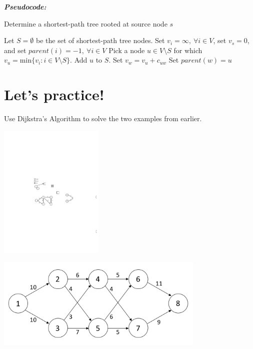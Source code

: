 \documentclass[12pt]{article}
\theoremstyle{definition}
\begin{document}
\emph{\textbf{Pseudocode:}}


\begin{algorithm}
\caption{Determine a shortest-path tree rooted at source node $s$}
\begin{algorithmic} 
\STATE Let $S = \emptyset$ be the set of shortest-path tree nodes.
\STATE Set $v_i = \infty, \ \forall i \in V$, set $v_s = 0$, and set $parent(i) = -1, \ \forall i \in V$
	\STATE Pick a node $u \in V \setminus S$ for which $v_u = \textrm{min} \{v_i: i \in V\setminus S\}$.
	\STATE Add $u$ to $S$.
			\STATE Set $v_w = v_u + c_{uw}$
			\STATE Set $parent(w) = u$
		\ENDIF
	\ENDFOR

\ENDWHILE
\end{algorithmic}
\end{algorithm}

\newpage

\section*{Let's practice!}

Use Dijkstra's Algorithm to solve the two examples from earlier.

\begin{center}
\includegraphics[width=5cm]{shortestpathexample1}
\end{center}
\vfill

\begin{center}
\includegraphics[width=10cm]{shortestpathexample2}
\end{center}
\end{document}
